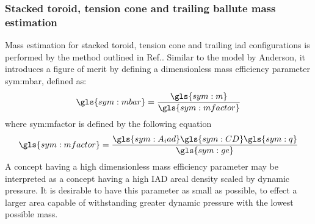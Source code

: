 \subsubsection{Stacked toroid, tension cone and trailing ballute mass estimation}
Mass estimation for stacked toroid, tension cone and trailing \gls{iad} configurations is performed by the method outlined in Ref.\cite{Samareh2011}. Similar to the model by Anderson, it introduces a figure of merit by defining a dimensionless mass efficiency parameter \gls{sym:mbar}, defined as:
\begin{equation}
\gls{sym:mbar} = \frac{\gls{sym:m}}{\gls{sym:mfactor}}
\label{eq:dimmass}
\end{equation}
where \gls{sym:mfactor} is defined by the following equation
\begin{equation}
\gls{sym:mfactor} = \frac{\gls{sym:A_iad} \gls{sym:CD} \gls{sym:q}}{\gls{sym:ge}}
\label{eq:mfactor}
\end{equation}
A concept having a high dimensionless mass efficiency parameter may be interpreted as a concept having a high IAD areal density scaled by dynamic pressure. It is desirable to have this parameter as small as possible, to effect a larger area capable of withstanding greater dynamic pressure with the lowest possible mass.

